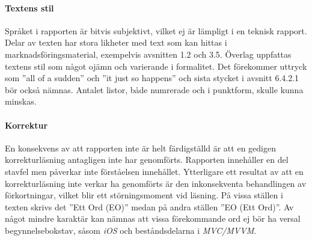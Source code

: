    \paragraph{Textens stil}
        Språket i rapporten är bitvis subjektivt, vilket ej är lämpligt i en teknisk rapport. Delar av texten har stora likheter med text som kan hittas i marknadsföringsmaterial, exempelvis avsnitten 1.2 och 3.5. Överlag uppfattas textens stil som något ojämn och varierande i formalitet. Det förekommer uttryck som ''all of a sudden'' och ''it just so happens'' och sista stycket i avsnitt 6.4.2.1 bör också nämnas. Antalet listor, både numrerade och i punktform, skulle kunna minskas.

    \paragraph{Korrektur}
        En konsekvens av att rapporten inte är helt färdigställd är att en gedigen korrekturläsning antagligen inte har genomförts. Rapporten innehåller en del stavfel men påverkar inte förståelsen innehållet. Ytterligare ett resultat av att en korrekturläsning inte verkar ha genomförts är den inkonsekventa behandlingen av förkortningar, vilket blir ett störningsmoment vid läsning. På vissa ställen i texten skrivs det ''Ett Ord (EO)'' medan på andra ställen ''EO (Ett Ord)''. Av något mindre karaktär kan nämnas att vissa förekommande ord ej bör ha versal begynnelsebokstav, såsom \emph{iOS} och beståndsdelarna i \emph{MVC/MVVM}. 

